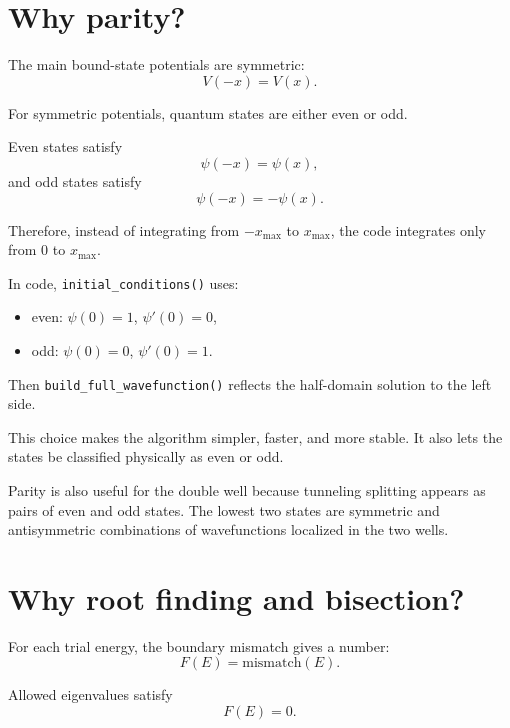 \documentclass[11pt]{article}
\begin{document}
    \section{Why parity?}

    The main bound-state potentials are symmetric:
    \begin{equation}
        V(-x)=V(x).
    \end{equation}

    For symmetric potentials, quantum states are either even or odd.

    Even states satisfy
    \begin{equation}
        \psi(-x)=\psi(x),
    \end{equation}
    and odd states satisfy
    \begin{equation}
        \psi(-x)=-\psi(x).
    \end{equation}

    Therefore, instead of integrating from $-x_{\max}$ to $x_{\max}$, the code integrates only from $0$ to $x_{\max}$.

    In code, \texttt{initial\_conditions()} uses:
    \begin{itemize}
        \item even: $\psi(0)=1$, $\psi'(0)=0$,
        \item odd: $\psi(0)=0$, $\psi'(0)=1$.
    \end{itemize}

    Then \texttt{build\_full\_wavefunction()} reflects the half-domain solution to the left side.

    This choice makes the algorithm simpler, faster, and more stable. It also lets the states be classified physically as even or odd.

    Parity is also useful for the double well because tunneling splitting appears as pairs of even and odd states. The lowest two states are symmetric and antisymmetric combinations of wavefunctions localized in the two wells.

    \section{Why root finding and bisection?}

    For each trial energy, the boundary mismatch gives a number:
    \begin{equation}
        F(E)=\text{mismatch}(E).
    \end{equation}

    Allowed eigenvalues satisfy
    \begin{equation}
        F(E)=0.
    \end{equation}
\end{document}
